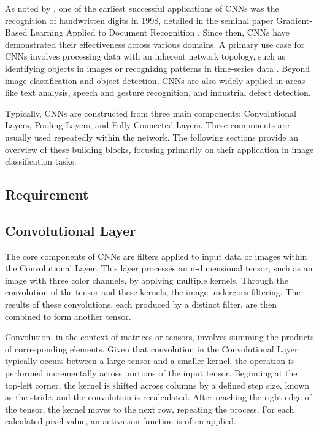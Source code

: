 As noted by \cite{Sharma:2018}, one of the earliest successful applications of CNNs was the recognition of handwritten digits in 1998, detailed in the seminal paper Gradient-Based Learning Applied to Document Recognition \cite{LeCun:1998}. Since then, CNNs have demonstrated their effectiveness across various domains. A primary use case for CNNs involves processing data with an inherent network topology, such as identifying objects in images or recognizing patterns in time-series data \cite{Namatevs:2017}. Beyond image classification and object detection, CNNs are also widely applied in areas like text analysis, speech and gesture recognition, and industrial defect detection. \cite{LopezdeLacalle:2020}

Typically, CNNs are constructed from three main components: Convolutional Layers, Pooling Layers, and Fully Connected Layers. These components are usually used repeatedly within the network. The following sections provide an overview of these building blocks, focusing primarily on their application in image classification tasks.


\subsection{Requirement}
\subsection{Convolutional Layer}

The core components of CNNs are filters applied to input data or images within the Convolutional Layer. This layer processes an n-dimensional tensor, such as an image with three color channels, by applying multiple kernels. Through the convolution of the tensor and these kernels, the image undergoes filtering. The results of these convolutions, each produced by a distinct filter, are then combined to form another tensor. \cite{Michelucci:2019}

Convolution, in the context of matrices or tensors, involves summing the products of corresponding elements. Given that convolution in the Convolutional Layer typically occurs between a large tensor and a smaller kernel, the operation is performed incrementally across portions of the input tensor. Beginning at the top-left corner, the kernel is shifted across columns by a defined step size, known as the stride, and the convolution is recalculated. After reaching the right edge of the tensor, the kernel moves to the next row, repeating the process. For each calculated pixel value, an activation function is often applied. \cite{Michelucci:2019}

